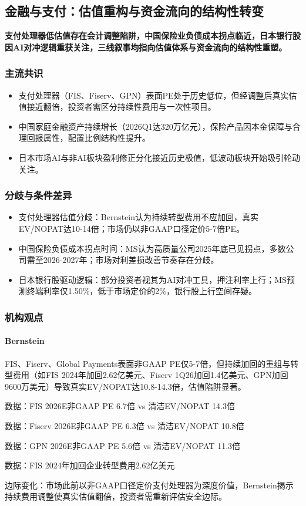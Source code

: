 \documentclass[11pt]{ctexart}
\begin{document}
\subsection{金融与支付：估值重构与资金流向的结构性转变}
\textbf{支付处理器低估值存在会计调整陷阱，中国保险业负债成本拐点临近，日本银行股因AI对冲逻辑重获关注，三线叙事均指向估值体系与资金流向的结构性重塑。}
\subsubsection*{主流共识}
\begin{itemize}
  \item 支付处理器（FIS、Fiserv、GPN）表面PE处于历史低位，但经调整后真实估值接近翻倍，投资者需区分持续性费用与一次性项目。
  \item 中国家庭金融资产持续增长（2026Q1达320万亿元），保险产品因本金保障与合理回报属性，配置比例结构性提升。
  \item 日本市场AI与非AI板块盈利修正分化接近历史极值，低波动板块开始吸引轮动关注。
\end{itemize}
\subsubsection*{分歧与条件差异}
\begin{itemize}
  \item 支付处理器估值分歧：Bernstein认为持续转型费用不应加回，真实EV/NOPAT达10-14倍；市场仍以非GAAP口径定价5-7倍PE。
  \item 中国保险负债成本拐点时间：MS认为高质量公司2025年底已见拐点，多数公司需至2026-2027年；市场对利差损改善节奏存在分歧。
  \item 日本银行股驱动逻辑：部分投资者视其为AI对冲工具，押注利率上行；MS预测终端利率仅1.50\%，低于市场定价的2\%，银行股上行空间存疑。
\end{itemize}
\subsubsection*{机构观点}
\paragraph{Bernstein} FIS、Fiserv、Global Payments表面非GAAP PE仅5-7倍，但持续加回的重组与转型费用（如FIS 2024年加回2.62亿美元、Fiserv 1Q26加回1.4亿美元、GPN加回9600万美元）导致真实EV/NOPAT达10.8-14.3倍，估值陷阱显著。
{\small\color{refgray}数据：FIS 2026E非GAAP PE 6.7倍 vs 清洁EV/NOPAT 14.3倍\par}
{\small\color{refgray}数据：Fiserv 2026E非GAAP PE 6.3倍 vs 清洁EV/NOPAT 10.8倍\par}
{\small\color{refgray}数据：GPN 2026E非GAAP PE 5.6倍 vs 清洁EV/NOPAT 11.3倍\par}
{\small\color{refgray}数据：FIS 2024年加回企业转型费用2.62亿美元\par}
{\small\color{refgray}边际变化：市场此前以非GAAP口径定价支付处理器为深度价值，Bernstein揭示持续费用调整使真实估值翻倍，投资者需重新评估安全边际。\par}
\end{document}
